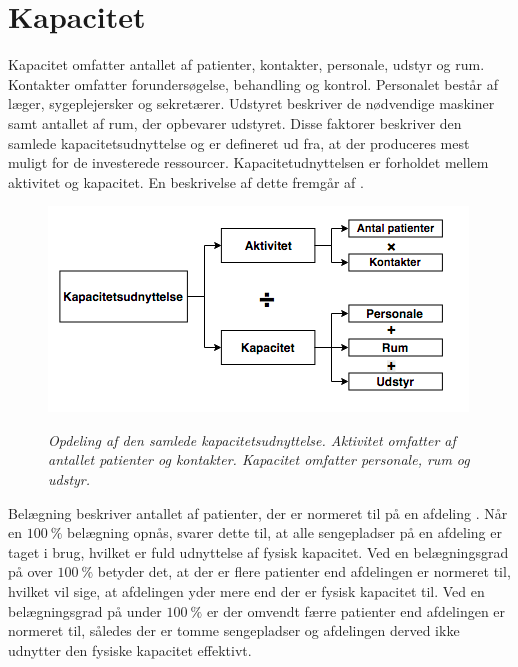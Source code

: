 \section{Kapacitet} \label{kap}
Kapacitet omfatter antallet af patienter, kontakter, personale, udstyr og rum. Kontakter omfatter forundersøgelse, behandling og kontrol. Personalet består af læger, sygeplejersker og sekretærer. Udstyret beskriver de nødvendige maskiner samt antallet af rum, der opbevarer udstyret. Disse faktorer beskriver den samlede kapacitetsudnyttelse og er defineret ud fra, at der produceres mest muligt for de investerede ressourcer. Kapacitetudnyttelsen er forholdet mellem aktivitet og kapacitet. \cite{Company2013} En beskrivelse af dette fremgår af .  

\begin{figure}[H]
	\flushleft 
	\centering
	\includegraphics[scale=.45]{figures/Kapacitetsudnyttelse.png}
	\label{kapacitet}
	\flushleft
	\caption{\textit{Opdeling af den samlede kapacitetsudnyttelse. Aktivitet omfatter af antallet patienter og kontakter. Kapacitet omfatter personale, rum og udstyr. \cite{Company2013}}}
\end{figure}

\noindent
Belægning beskriver antallet af patienter, der er normeret til på en afdeling \cite{Heidmann2014}. Når en $100~\%$ belægning opnås, svarer dette til, at alle sengepladser på en afdeling er taget i brug, hvilket er fuld udnyttelse af fysisk kapacitet. Ved en belægningsgrad på over $100~\%$ betyder det, at der er flere patienter end afdelingen er normeret til, hvilket vil sige, at afdelingen yder mere end der er fysisk kapacitet til. Ved en belægningsgrad på under $100~\%$ er der omvendt færre patienter end afdelingen er normeret til, således der er tomme sengepladser og afdelingen derved ikke udnytter den fysiske kapacitet effektivt. \cite{Pauly1986} 

